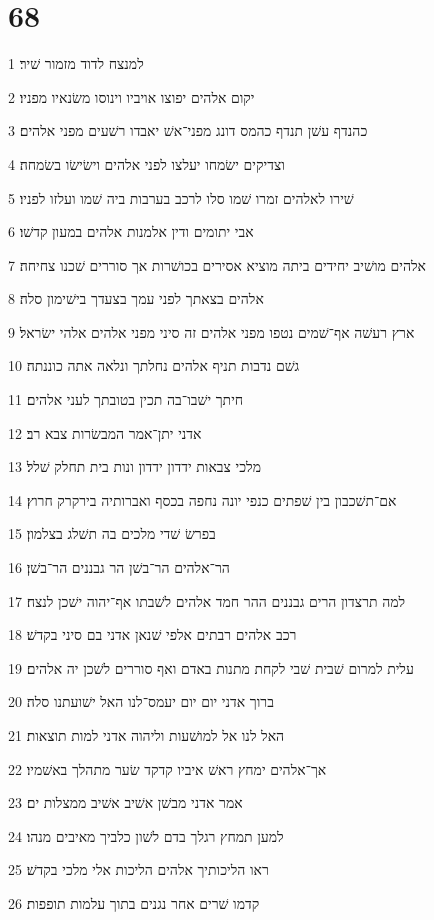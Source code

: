 \chapter{68}

\par 1 למנצח לדוד מזמור שׁיר׃
\par 2 יקום אלהים יפוצו אויביו וינוסו משׂנאיו מפניו׃
\par 3 כהנדף עשׁן תנדף כהמס דונג מפני־אשׁ יאבדו רשׁעים מפני אלהים׃
\par 4 וצדיקים ישׂמחו יעלצו לפני אלהים וישׂישׂו בשׂמחה׃
\par 5 שׁירו לאלהים זמרו שׁמו סלו לרכב בערבות ביה שׁמו ועלזו לפניו׃
\par 6 אבי יתומים ודין אלמנות אלהים במעון קדשׁו׃
\par 7 אלהים מושׁיב יחידים ביתה מוציא אסירים בכושׁרות אך סוררים שׁכנו צחיחה׃
\par 8 אלהים בצאתך לפני עמך בצעדך בישׁימון סלה׃
\par 9 ארץ רעשׁה אף־שׁמים נטפו מפני אלהים זה סיני מפני אלהים אלהי ישׂראל׃
\par 10 גשׁם נדבות תניף אלהים נחלתך ונלאה אתה כוננתה׃
\par 11 חיתך ישׁבו־בה תכין בטובתך לעני אלהים׃
\par 12 אדני יתן־אמר המבשׂרות צבא רב׃
\par 13 מלכי צבאות ידדון ידדון ונות בית תחלק שׁלל׃
\par 14 אם־תשׁכבון בין שׁפתים כנפי יונה נחפה בכסף ואברותיה בירקרק חרוץ׃
\par 15 בפרשׂ שׁדי מלכים בה תשׁלג בצלמון׃
\par 16 הר־אלהים הר־בשׁן הר גבננים הר־בשׁן׃
\par 17 למה תרצדון הרים גבננים ההר חמד אלהים לשׁבתו אף־יהוה ישׁכן לנצח׃
\par 18 רכב אלהים רבתים אלפי שׁנאן אדני בם סיני בקדשׁ׃
\par 19 עלית למרום שׁבית שׁבי לקחת מתנות באדם ואף סוררים לשׁכן יה אלהים׃
\par 20 ברוך אדני יום יום יעמס־לנו האל ישׁועתנו סלה׃
\par 21 האל לנו אל למושׁעות וליהוה אדני למות תוצאות׃
\par 22 אך־אלהים ימחץ ראשׁ איביו קדקד שׂער מתהלך באשׁמיו׃
\par 23 אמר אדני מבשׁן אשׁיב אשׁיב ממצלות ים׃
\par 24 למען תמחץ רגלך בדם לשׁון כלביך מאיבים מנהו׃
\par 25 ראו הליכותיך אלהים הליכות אלי מלכי בקדשׁ׃
\par 26 קדמו שׁרים אחר נגנים בתוך עלמות תופפות׃
